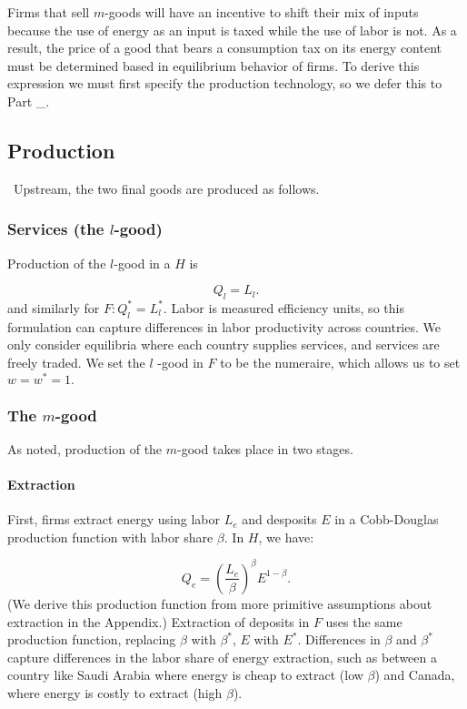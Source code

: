 \documentclass[notitlepage,12pt]{article}
\begin{document}
Firms that sell $m$-goods will have an incentive to shift their mix of
inputs because the use of energy as an input is taxed while the use of labor
is not. As a result, the price of a good that bears a consumption tax on its
energy content must be determined based in equilibrium behavior of firms. To
derive this expression we must first specify the production technology, so
we defer this to Part \_. 

\subsection{Production}

\ Upstream, the two final goods are produced as follows.

\subsubsection{Services (the $l$-good)}

Production of the $l$-good in a $H$ is

\begin{equation*}
Q_{l}=L_{l}.
\end{equation*}%
and similarly for $F:Q_{l}^{\ast }=L_{l}^{\ast }$. Labor is measured
efficiency units, so this formulation can capture differences in labor
productivity across countries. We only consider equilibria where each
country supplies services, and services are freely traded. We set the $l$%
-good in $F$ to be the numeraire, which allows us to set $w=w^{\ast }=1.$

\subsubsection{The $m$-good}

As noted, production of the $m$-good takes place in two stages. 

\paragraph{Extraction}

First, firms extract energy using labor $L_{e}$ and desposits $E$ in a
Cobb-Douglas production function with labor share $\beta $. In $H$, we have:

\begin{equation*}
Q_{e}=\left( \frac{L_{e}}{\beta }\right) ^{\beta }E^{1-\beta }.
\end{equation*}%
(We derive this production function from more primitive assumptions about
extraction in the Appendix.) Extraction of deposits in $F$ uses the same
production function, replacing $\beta $ with $\beta ^{\ast }$, $E$ with $%
E^{\ast }$. Differences in $\beta $ and $\beta ^{\ast }$ capture differences
in the labor share of energy extraction, such as between a country like
Saudi Arabia where energy is cheap to extract (low $\beta $) and Canada,
where energy is costly to extract (high $\beta $).
\end{document}
